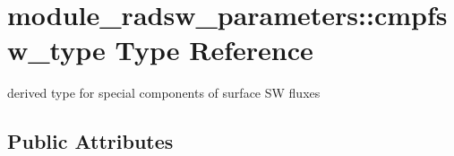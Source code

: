 \hypertarget{structmodule__radsw__parameters_1_1cmpfsw__type}{}\section{module\+\_\+radsw\+\_\+parameters\+:\+:cmpfsw\+\_\+type Type Reference}
\label{structmodule__radsw__parameters_1_1cmpfsw__type}


derived type for special components of surface SW fluxes  


\subsection*{Public Attributes}
\textbf{ }\par
